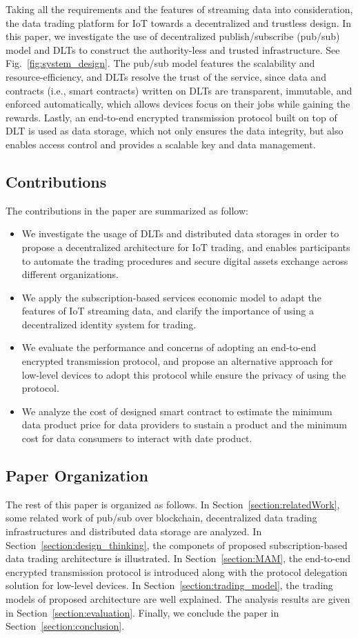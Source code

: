 \documentclass[conference]{IEEEtran}
\begin{document}
Taking all the requirements and the features of streaming data into consideration, the data trading platform for IoT towards a decentralized and trustless design. In this paper, we investigate the use of decentralized publish/subscribe (pub/sub) model and DLTs to construct the authority-less and trusted infrastructure. See Fig.~\ref{fig:system_design}. The pub/sub model features the scalability and resource-efficiency, and DLTs resolve the trust of the service, since data and contracts (i.e., smart contracts) written on DLTs are transparent, immutable, and enforced automatically, which allows devices focus on their jobs while gaining the rewards. Lastly, an end-to-end encrypted transmission protocol built on top of DLT is used as data storage, which not only ensures the data integrity, but also enables access control and provides a scalable key and data management.

\subsection{Contributions}
The contributions in the paper are summarized as follow:
\begin{itemize}
	\item We investigate the usage of DLTs and distributed data storages in order to propose a decentralized architecture for IoT trading, and enables participants to automate the trading procedures and secure digital assets exchange across different organizations.
	\item We apply the subscription-based services economic model to adapt the features of IoT streaming data, and clarify the importance of using a decentralized identity system for trading.
	\item We evaluate the performance and concerns of adopting an end-to-end encrypted transmission protocol, and propose an alternative approach for low-level devices to adopt this protocol while ensure the privacy of using the protocol.
	\item We analyze the cost of designed smart contract to estimate the minimum data product price for data providers to sustain a product and the minimum cost for data consumers to interact with date product.
\end{itemize}


\subsection{Paper Organization}
The rest of this paper is organized as follows. In Section~\ref{section:relatedWork}, some related work of pub/sub over blockchain, decentralized data trading infrastructures and distributed data storage are analyzed. In Section~\ref{section:design_thinking}, the componets of proposed subscription-based data trading architecture is illustrated. In Section~\ref{section:MAM}, the end-to-end encrypted transmission protocol is introduced along with the protocol delegation solution for low-level devices. In Section~\ref{section:trading_model}, the trading models of proposed architecture are well explained. The analysis results are given in Section~\ref{section:evaluation}. Finally, we conclude the paper in Section~\ref{section:conclusion}.
\end{document}
